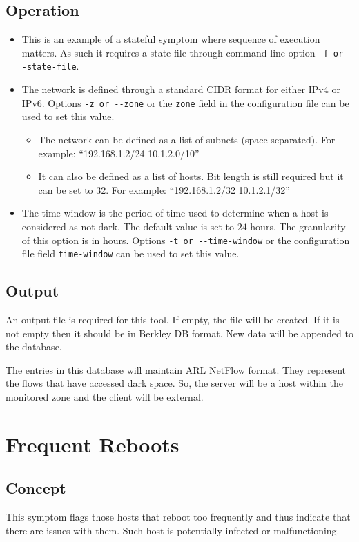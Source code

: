 \documentclass[titlepage,12pt]{report}
\begin{document}
\subsection{Operation}
\begin{itemize}
\item This is an example of a stateful symptom where sequence of execution matters. As such it requires a state file through command line option \verb|-f or --state-file|.
\item The network is defined through a standard CIDR format for either IPv4 or IPv6. Options \verb|-z or --zone| or the \verb|zone| field in the configuration file can be used to set this value.
	\begin{itemize}
	\item The network can be defined as a list of subnets (space separated). For example: ``192.168.1.2/24 10.1.2.0/10''
	\item It can also be defined as a list of hosts. Bit length is still required but it can be set to $32$. For example: ``192.168.1.2/32 10.1.2.1/32''
	\end{itemize}
\item The time window is the period of time used to determine when a host is considered as not dark. The default value is set to $24$ hours. The granularity of this option is in hours. Options \verb|-t or --time-window| or the configuration file field \verb|time-window| can be used to set this value.
\end{itemize}

\subsection{Output}
An output file is required for this tool. If empty, the file will be created. If it is not empty then it should be in Berkley DB format. New data will be appended to the database.

The entries in this database will maintain ARL NetFlow format. They represent the flows that have accessed dark space. So, the server will be a host within the monitored zone and the client will be external.

\section{Frequent Reboots}
\subsection{Concept}
This symptom flags those hosts that reboot too frequently and thus indicate that there are issues with them. Such host is potentially infected or malfunctioning.
\end{document}
